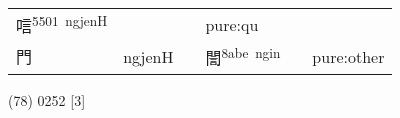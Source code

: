 \documentclass[14pt,a4paper]{scrartcl}
\begin{document}
\begin{longtable}[c]{@{}llllll@{}}
\begin{minipage}[t]{0.14\columnwidth}
唁\textsuperscript{5501~ngjenH}
\strut\end{minipage} &
\begin{minipage}[t]{0.14\columnwidth}\raggedright\strut
\strut\end{minipage} &
\begin{minipage}[t]{0.14\columnwidth}\raggedright\strut
\strut\end{minipage} &
\begin{minipage}[t]{0.14\columnwidth}\raggedright\strut
pure:qu
\strut\end{minipage}\tabularnewline
\begin{minipage}[t]{0.14\columnwidth}\raggedright\strut
門
\strut\end{minipage} &
\begin{minipage}[t]{0.14\columnwidth}\raggedright\strut
ngjenH
\strut\end{minipage} &
\begin{minipage}[t]{0.14\columnwidth}\raggedright\strut
\strut\end{minipage} &
\begin{minipage}[t]{0.14\columnwidth}\raggedright\strut
誾\textsuperscript{8abe~ngin}
\strut\end{minipage} &
\begin{minipage}[t]{0.14\columnwidth}\raggedright\strut
\strut\end{minipage} &
\begin{minipage}[t]{0.14\columnwidth}\raggedright\strut
pure:other
\strut\end{minipage}\tabularnewline
\bottomrule
\end{longtable}

(78) 0252 {[}3{]}
\end{document}
